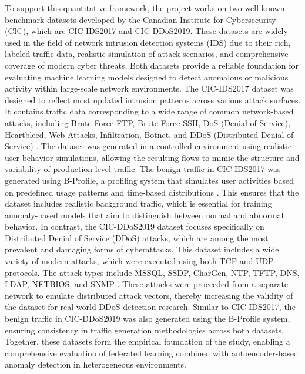 To support this quantitative framework, the project works on two well-known benchmark datasets developed by the Canadian Institute for Cybersecurity (CIC), which are CIC-IDS2017 and CIC-DDoS2019. These datasets are widely used in the field of network intrusion detection systems (IDS) due to their rich, labeled traffic data, realistic simulation of attack scenarios, and comprehensive coverage of modern cyber threats. Both datasets provide a reliable foundation for evaluating machine learning models designed to detect anomalous or malicious activity within large-scale network environments. The CIC-IDS2017 dataset was designed to reflect most updated intrusion patterns across various attack surfaces. It contains traffic data corresponding to a wide range of common network-based attacks, including Brute Force FTP, Brute Force SSH, DoS (Denial of Service), Heartbleed, Web Attacks, Infiltration, Botnet, and DDoS (Distributed Denial of Service) \citep{cicids2017}. The dataset was generated in a controlled environment using realistic user behavior simulations, allowing the resulting flows to mimic the structure and variability of production-level traffic. The benign traffic in CIC-IDS2017 was generated using B-Profile, a profiling system that simulates user activities based on predefined usage patterns and time-based distributions \citep{bprofile}. This ensures that the dataset includes realistic background traffic, which is essential for training anomaly-based models that aim to distinguish between normal and abnormal behavior. In contrast, the CIC-DDoS2019 dataset focuses specifically on Distributed Denial of Service (DDoS) attacks, which are among the most prevalent and damaging forms of cyberattacks. This dataset includes a wide variety of modern attacks, which were executed using both TCP and UDP protocols. The attack types include MSSQL, SSDP, CharGen, NTP, TFTP, DNS, LDAP, NETBIOS, and SNMP \citep{cicddos2019}. These attacks were proceeded from a separate network to emulate distributed attack vectors, thereby increasing the validity of the dataset for real-world DDoS detection research. Similar to CIC-IDS2017, the benign traffic in CIC-DDoS2019 was also generated using the B-Profile system, ensuring consistency in traffic generation methodologies across both datasets. Together, these datasets form the empirical foundation of the study, enabling a comprehensive evaluation of federated learning combined with autoencoder-based anomaly detection in heterogeneous environments.

